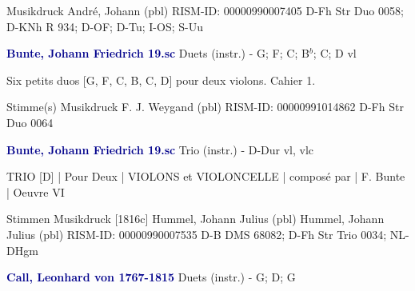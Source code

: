 \documentclass[twocolumn]{book}
\begin{document}
\newline Musikdruck
\newline André, Johann  (pbl)
\newline RISM-ID: 00000990007405
\newline D-Fh  Str Duo 0058; D-KNh  R 934; D-OF; D-Tu; I-OS; S-Uu
\newline \par \vspace{7pt} \textcolor{darkblue}{\textbf{Bunte, Johann Friedrich  19.sc}}
\newline Duets (instr.) - G; F; C; B$^b$; C; D
 vl
\newline \begin{itshape}Six petits duos [G, F, C, B, C, D] pour deux violons. Cahier 1.\end{itshape} 
\newline \textcolor{darkblue}{}  Stimme(s)
\newline Musikdruck
\newline F. J. Weygand  (pbl)
\newline RISM-ID: 00000991014862
\newline D-Fh  Str Duo 0064
\newline \par \vspace{7pt} \textcolor{darkblue}{\textbf{Bunte, Johann Friedrich  19.sc}}
\newline Trio (instr.) - D-Dur
 vl, vlc
\newline \begin{itshape}TRIO [D] | Pour Deux | VIOLONS et VIOLONCELLE | composé par | F. Bunte | Oeuvre VI\end{itshape} 
\newline \textcolor{darkblue}{}  Stimmen
\newline Musikdruck  [1816c]
\newline Hummel, Johann Julius  (pbl)
\newline Hummel, Johann Julius  (pbl)
\newline RISM-ID: 00000990007535
\newline D-B  DMS 68082; D-Fh  Str Trio 0034; NL-DHgm
\newline \par \vspace{7pt} \textcolor{darkblue}{\textbf{Call, Leonhard von  1767-1815}}
\newline Duets (instr.) - G; D; G
\end{document}
